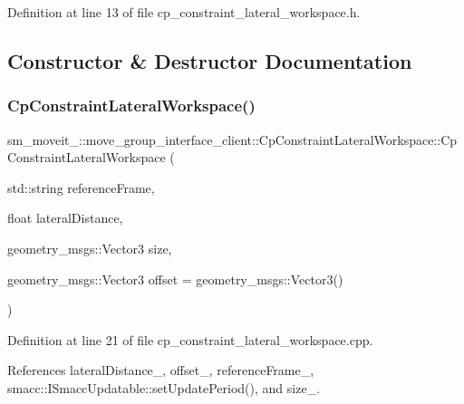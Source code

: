 Definition at line 13 of file cp\+\_\+constraint\+\_\+lateral\+\_\+workspace.\+h.



\subsection{Constructor \& Destructor Documentation}
\mbox{\label{classsm__moveit__4_1_1move__group__interface__client_1_1CpConstraintLateralWorkspace_a66a920bf3a53eae1c06cf8e1f2409cf8}} 
\subsubsection{\texorpdfstring{Cp\+Constraint\+Lateral\+Workspace()}{CpConstraintLateralWorkspace()}}
{\footnotesize\ttfamily sm\+\_\+moveit\+\_\+::move\+\_\+group\+\_\+interface\+\_\+client\+::\+Cp\+Constraint\+Lateral\+Workspace\+::\+Cp\+Constraint\+Lateral\+Workspace (\begin{DoxyParamCaption}\item[{std\+::string}]{reference\+Frame,  }\item[{float}]{lateral\+Distance,  }\item[{geometry\+\_\+msgs\+::\+Vector3}]{size,  }\item[{geometry\+\_\+msgs\+::\+Vector3}]{offset = {\ttfamily geometry\+\_\+msgs\+:\+:Vector3()} }\end{DoxyParamCaption})}



Definition at line 21 of file cp\+\_\+constraint\+\_\+lateral\+\_\+workspace.\+cpp.



References lateral\+Distance\+\_\+, offset\+\_\+, reference\+Frame\+\_\+, smacc\+::\+I\+Smacc\+Updatable\+::set\+Update\+Period(), and size\+\_\+.


